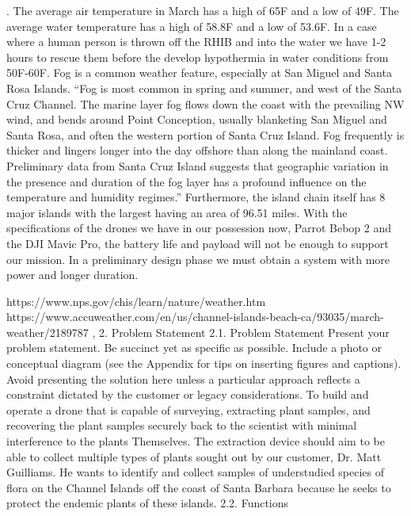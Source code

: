 . The average air temperature in March has a high of 65F and a low of 49F. The average water temperature has a high of 58.8F and a low of 53.6F. In a case where a human person is thrown off the RHIB and into the water we have 1-2 hours to rescue them before the develop hypothermia in water conditions from 50F-60F. Fog is a common weather feature, especially at San Miguel and Santa Rosa Islands. “Fog is most common in spring and summer, and west of the Santa Cruz Channel. The marine layer fog flows down the coast with the prevailing NW wind, and bends around Point Conception, usually blanketing San Miguel and Santa Rosa, and often the western portion of Santa Cruz Island. Fog frequently is thicker and lingers longer into the day offshore than along the mainland coast. Preliminary data from Santa Cruz Island suggests that geographic variation in the presence and duration of the fog layer has a profound influence on the temperature and humidity regimes.” Furthermore, the island chain itself has 8 major islands with the largest having an area of 96.51 miles. With the specifications of the drones we have in our possession now, Parrot Bebop 2 and the DJI Mavic Pro, the battery life and payload will not be enough to support our mission. In a preliminary design phase we must obtain a system with more power and longer duration. 

https://www.nps.gov/chis/learn/nature/weather.htm
https://www.accuweather.com/en/us/channel-islands-beach-ca/93035/march-weather/2189787 ,
    2. Problem Statement
        2.1. Problem Statement
Present your problem statement.   Be succinct yet as specific as possible.  Include a photo or conceptual diagram (see the Appendix for tips on inserting figures and captions).   Avoid presenting the solution here unless a particular approach reflects a constraint dictated by the customer or legacy considerations.
To build and operate a drone that is capable of surveying, extracting plant samples, and recovering the plant samples securely back to the scientist with minimal interference to the plants Themselves. The extraction device should aim to be able to collect multiple types of plants sought out by our customer, Dr. Matt Guilliams. He wants to identify and collect samples of understudied species of flora on the Channel Islands off the coast of Santa Barbara because he seeks to protect the endemic plants of these islands. 
        2.2. Functions

